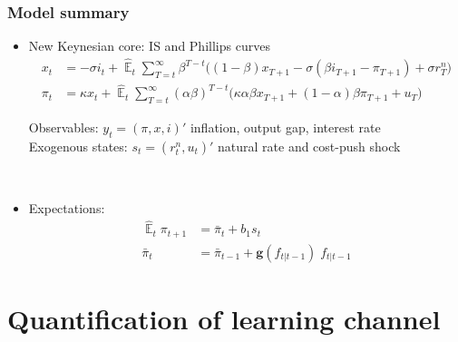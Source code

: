 \documentclass[10pt]{beamer}
\DeclareMathOperator{\E}{\mathbb{E}}
\begin{document}
\begin{frame}
	\frametitle{Model summary}
	\label{aggregate_LOMS}
\begin{itemize}
\item New Keynesian core: IS and Phillips curves	
 \begin{align}
x_t &=  -\sigma i_t +\hat{\E}_t \sum_{T=t}^{\infty} \beta^{T-t }\big( (1-\beta)x_{T+1} - \sigma(\beta i_{T+1} - \pi_{T+1}) +\sigma r_T^n \big)  \label{NKIS}  \\
\pi_t &= \kappa x_t +\hat{\E}_t \sum_{T=t}^{\infty} (\alpha\beta)^{T-t }\big( \kappa \alpha \beta x_{T+1} + (1-\alpha)\beta \pi_{T+1} + u_T\big) \label{NKPC} 
\end{align}
\hfill \hyperlink{derivations}{} \hyperlink{ALMs}{}

\vspace{0.5cm}

Observables: $y_t = (\pi, x, i)'$ inflation, output gap, interest rate \\
Exogenous states: $s_t = (r^n_t, u_t)'$ natural rate and cost-push shock

\
\pause
\item Expectations: 
\begin{align}
\hat{\E}_{t}\pi_{t+1} & = \bar{\pi}_{t} + b_1 s_t \\
\bar{\pi}_{t}  &=\bar{\pi}_{t-1} +\mathbf{g}(f_{t|t-1}) \; f_{t|t-1}
\end{align}


\end{itemize}



\end{frame}



\section{Quantification of learning channel}
\end{document}
